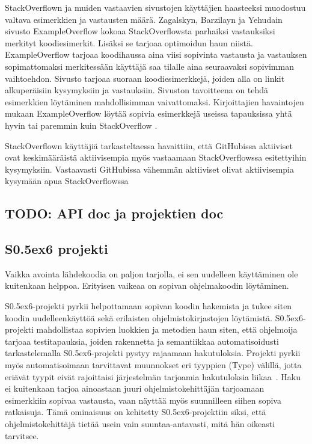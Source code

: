 \documentclass[finnish]{tktltiki2}
\theoremstyle{definition}
\theoremstyle{remark}
\begin{document}
StackOverflown ja muiden vastaavien sivustojen käyttäjien haasteeksi muodostuu valtava esimerkkien ja vastausten määrä. Zagalskyn, Barzilayn ja Yehudain sivusto ExampleOverflow kokoaa StackOverflowsta parhaiksi vastauksiksi merkityt koodiesimerkit. Lisäksi se tarjoaa optimoidun haun niistä. ExampleOverflow tarjoaa koodihaussa aina viisi sopivinta vastausta ja vastauksen sopimattomaksi merkitessään käyttäjä saa tilalle aina seuraavaksi sopivimman vaihtoehdon. Sivusto tarjoaa suoraan koodiesimerkkejä, joiden alla on linkit alkuperäisiin kysymyksiin ja vastauksiin. Sivuston tavoitteena on tehdä esimerkkien löytäminen mahdollisimman vaivattomaksi. Kirjoittajien havaintojen mukaan ExampleOverflow löytää sopivia esimerkkejä useissa tapauksissa yhtä hyvin tai paremmin kuin StackOverflow \cite{example-overflow-social-media-for-code-recommendations}.

StackOverflown käyttäjiä tarkasteltaessa havaittiin, että GitHubissa aktiiviset ovat keskimääräistä aktiivisempia myös vastaamaan StackOverflowssa esitettyihin kysymyksiin. Vastaavasti GitHubissa vähemmän aktiiviset olivat aktiivisempia kysymään apua StackOverflowssa~\cite{stackoverflow-and-github}

\subsection{TODO: API doc ja projektien doc}
\subsection{S\raise0.5ex\hbox{6} projekti}
Vaikka avointa lähdekoodia on paljon tarjolla, ei sen uudelleen käyttäminen ole kuitenkaan helppoa. Erityisen vaikeaa on sopivan ohjelmakoodin löytäminen.

S\raise0.5ex\hbox{6}-projekti pyrkii helpottamaan sopivan koodin hakemista ja tukee siten koodin uudelleenkäyttöä sekä erilaisten ohjelmistokirjastojen löytämistä. S\raise0.5ex\hbox{6}-projekti mahdollistaa sopivien luokkien ja metodien haun siten, että ohjelmoija tarjoaa testitapauksia, joiden rakennetta ja semantiikkaa automatisoidusti tarkastelemalla S\raise0.5ex\hbox{6}-projekti pystyy rajaamaan hakutuloksia. Projekti pyrkii myös automatisoimaan tarvittavat muunnokset eri tyyppien (Type) välillä, jotta eriävät tyypit eivät rajoittaisi järjestelmän tarjoamia hakutuloksia liikaa~\cite{what-to-search-for}. Haku ei kuitenkaan tarjoa ainoastaan juuri ohjelmistokehittäjän tarjoamaan esimerkkiin sopivaa vastausta, vaan näyttää myös suunnilleen siihen sopiva ratkaisuja. Tämä ominaisuus on kehitetty S\raise0.5ex\hbox{6}-projektiin siksi, että ohjelmistokehittäjä tietää usein vain suuntaa-antavasti, mitä hän oikeasti tarvitsee.
\end{document}
